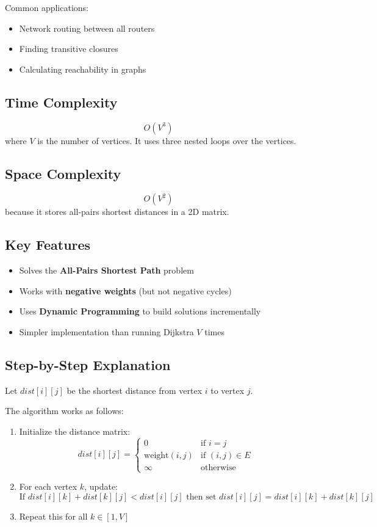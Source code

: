\documentclass[14pt,a4paper]{extarticle}
\begin{document}
Common applications:
\begin{itemize}[leftmargin=1.5em]
    \item Network routing between all routers
    \item Finding transitive closures
    \item Calculating reachability in graphs
\end{itemize}

\subsection{Time Complexity}
\[
O(V^3)
\]
where \( V \) is the number of vertices. It uses three nested loops over the vertices.

\subsection{Space Complexity}
\[
O(V^2)
\]
because it stores all-pairs shortest distances in a 2D matrix.

\subsection{Key Features}
\begin{itemize}[leftmargin=1.5em]
    \item Solves the \textbf{All-Pairs Shortest Path} problem
    \item Works with \textbf{negative weights} (but not negative cycles)
    \item Uses \textbf{Dynamic Programming} to build solutions incrementally
    \item Simpler implementation than running Dijkstra \( V \) times
\end{itemize}

\newpage
\subsection{Step-by-Step Explanation}
Let \( dist[i][j] \) be the shortest distance from vertex \( i \) to vertex \( j \).

The algorithm works as follows:
\begin{enumerate}[leftmargin=1.5em]
    \item Initialize the distance matrix:
    \[
    dist[i][j] = \begin{cases}
        0 & \text{if } i = j \\
        \text{weight}(i, j) & \text{if } (i, j) \in E \\
        \infty & \text{otherwise}
    \end{cases}
    \]
    \item For each vertex \( k \), update:
    \[
    \text{If } dist[i][k] + dist[k][j] < dist[i][j] \text{ then set } dist[i][j] = dist[i][k] + dist[k][j]
    \]
    \item Repeat this for all \( k \in [1, V] \)
\end{enumerate}
\end{document}
